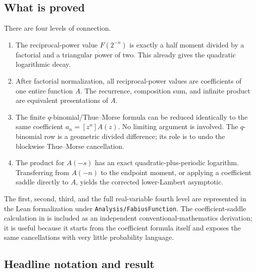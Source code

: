 \documentclass[11pt,oneside]{article}
\theoremstyle{definition}
\theoremstyle{remark}
\newcommand{\repo}{\nolinkurl{Analysis/FabiusFunction}}
\begin{document}
\subsection{What is proved}

There are four levels of connection.

\begin{enumerate}
\item The reciprocal-power value $F(2^{-n})$ is exactly a half moment divided by a factorial
and a triangular power of two.  This already gives the quadratic logarithmic decay.

\item After factorial normalization, all reciprocal-power values are coefficients of one
entire function $A$.  The recurrence, composition sum, and infinite product are equivalent
presentations of $A$.

\item The finite $q$-binomial/Thue--Morse formula can be reduced identically to the same
coefficient $a_n=[z^n]A(z)$.  No limiting argument is involved.  The $q$-binomial row is a
geometric divided difference; its role is to undo the blockwise Thue--Morse cancellation.

\item The product for $A(-s)$ has an exact quadratic-plus-periodic logarithm.  Transferring
from $A(-n)$ to the endpoint moment, or applying a coefficient saddle directly to $A$, yields
the corrected lower-Lambert asymptotic.
\end{enumerate}

The first, second, third, and the full real-variable fourth level are represented in the Lean
formalization under \repo.  The coefficient-saddle calculation in 
is included as an independent conventional-mathematics derivation; it is useful because it
starts from the coefficient formula itself and exposes the same cancellations with very
little probability language.

\subsection{Headline notation and result}
\end{document}
